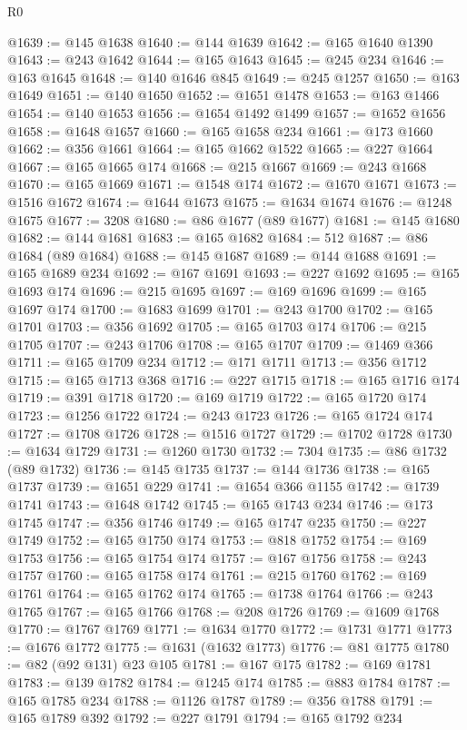 \begin{lexlean}{R0}
\begin{coremodule}
@1639 := @145 @1638
@1640 := @144 @1639
@1642 := @165 @1640 @1390
@1643 := @243 @1642
@1644 := @165 @1643
@1645 := @245 @234
@1646 := @163 @1645
@1648 := @140 @1646 @845
@1649 := @245 @1257
@1650 := @163 @1649
@1651 := @140 @1650
@1652 := @1651 @1478
@1653 := @163 @1466
@1654 := @140 @1653
@1656 := @1654 @1492 @1499
@1657 := @1652 @1656
@1658 := @1648 @1657
@1660 := @165 @1658 @234
@1661 := @173 @1660
@1662 := @356 @1661
@1664 := @165 @1662 @1522
@1665 := @227 @1664
@1667 := @165 @1665 @174
@1668 := @215 @1667
@1669 := @243 @1668
@1670 := @165 @1669
@1671 := @1548 @174
@1672 := @1670 @1671
@1673 := @1516 @1672
@1674 := @1644 @1673
@1675 := @1634 @1674
@1676 := @1248 @1675
@1677 := 3208
@1680 := @86 @1677 (@89 @1677)
@1681 := @145 @1680
@1682 := @144 @1681
@1683 := @165 @1682
@1684 := 512
@1687 := @86 @1684 (@89 @1684)
@1688 := @145 @1687
@1689 := @144 @1688
@1691 := @165 @1689 @234
@1692 := @167 @1691
@1693 := @227 @1692
@1695 := @165 @1693 @174
@1696 := @215 @1695
@1697 := @169 @1696
@1699 := @165 @1697 @174
@1700 := @1683 @1699
@1701 := @243 @1700
@1702 := @165 @1701
@1703 := @356 @1692
@1705 := @165 @1703 @174
@1706 := @215 @1705
@1707 := @243 @1706
@1708 := @165 @1707
@1709 := @1469 @366
@1711 := @165 @1709 @234
@1712 := @171 @1711
@1713 := @356 @1712
@1715 := @165 @1713 @368
@1716 := @227 @1715
@1718 := @165 @1716 @174
@1719 := @391 @1718
@1720 := @169 @1719
@1722 := @165 @1720 @174
@1723 := @1256 @1722
@1724 := @243 @1723
@1726 := @165 @1724 @174
@1727 := @1708 @1726
@1728 := @1516 @1727
@1729 := @1702 @1728
@1730 := @1634 @1729
@1731 := @1260 @1730
@1732 := 7304
@1735 := @86 @1732 (@89 @1732)
@1736 := @145 @1735
@1737 := @144 @1736
@1738 := @165 @1737
@1739 := @1651 @229
@1741 := @1654 @366 @1155
@1742 := @1739 @1741
@1743 := @1648 @1742
@1745 := @165 @1743 @234
@1746 := @173 @1745
@1747 := @356 @1746
@1749 := @165 @1747 @235
@1750 := @227 @1749
@1752 := @165 @1750 @174
@1753 := @818 @1752
@1754 := @169 @1753
@1756 := @165 @1754 @174
@1757 := @167 @1756
@1758 := @243 @1757
@1760 := @165 @1758 @174
@1761 := @215 @1760
@1762 := @169 @1761
@1764 := @165 @1762 @174
@1765 := @1738 @1764
@1766 := @243 @1765
@1767 := @165 @1766
@1768 := @208 @1726
@1769 := @1609 @1768
@1770 := @1767 @1769
@1771 := @1634 @1770
@1772 := @1731 @1771
@1773 := @1676 @1772
@1775 := @1631 (@1632 @1773)
@1776 := @81 @1775
@1780 := @82 (@92 @131) @23 @105
@1781 := @167 @175
@1782 := @169 @1781
@1783 := @139 @1782
@1784 := @1245 @174
@1785 := @883 @1784
@1787 := @165 @1785 @234
@1788 := @1126 @1787
@1789 := @356 @1788
@1791 := @165 @1789 @392
@1792 := @227 @1791
@1794 := @165 @1792 @234

\end{coremodule}
\end{lexlean}
